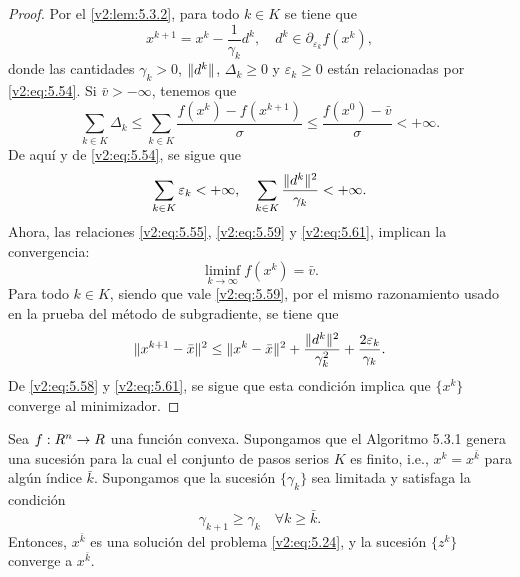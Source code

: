 \begin{proof}
    Por el \cref{v2:lem:5.3.2}, para todo $k \in K$ se tiene que
    \begin{equation}
        x^{k+1} = x^k - \frac{1}{\gamma_k} d^k, \quad d^k \in \partial_{\varepsilon_k} f(x^k),
        \label{v2:eq:5.59}
    \end{equation}
    donde las cantidades $\gamma_k > 0$, $\lVert d^k\rVert$, $\Delta_k \ge 0$ y $\varepsilon_k \ge 0$ están relacionadas por \eqref{v2:eq:5.54}.
    Si $\bar{v} > -\infty$, tenemos que
    \begin{equation}
        \sum_{k \in K} \Delta_k \le \sum_{k \in K} \frac{f(x^k) - f(x^{k+1})}{\sigma} \le \frac{f(x^0) - \bar{v}}{\sigma} < +\infty.
        \label{v2:eq:5.60}
    \end{equation}
    De aquí y de \eqref{v2:eq:5.54}, se sigue que
    \begin{equation}
        \sum_{k \in K} \varepsilon_k < +\infty, \quad \sum_{k \in K} \frac{\lVert d^k\rVert^2}{\gamma_k} < +\infty.
        \label{v2:eq:5.61}
    \end{equation}
    Ahora, las relaciones \eqref{v2:eq:5.55}, \eqref{v2:eq:5.59} y \eqref{v2:eq:5.61}, implican la convergencia:
    \[
        \liminf_{k \to \infty} f(x^k) = \bar{v}.
    \]
    Para todo $k \in K$, siendo que vale \eqref{v2:eq:5.59}, por el mismo razonamiento usado en la prueba del método de subgradiente, se tiene que
    \begin{equation}
        \lVert x^{k+1} - \bar{x}\rVert^2 \le \lVert x^k - \bar{x}\rVert^2 + \frac{\lVert d^k\rVert^2}{\gamma_k^2} + \frac{2\varepsilon_k}{\gamma_k}.
        \label{v2:eq:5.62}
    \end{equation}
    De \eqref{v2:eq:5.58} y \eqref{v2:eq:5.61}, se sigue que esta condición implica que $\{x^k\}$ converge al minimizador.
\end{proof}

\begin{theorem}\label{v2:thm:5.3.2}
    Sea $f : R^n \to R$ una función convexa. Supongamos que el Algoritmo 5.3.1 genera una sucesión para la cual el conjunto de pasos serios $K$ es finito, i.e., $x^k = x^{\bar{k}}$ para algún índice $\bar{k}$. Supongamos que la sucesión $\{\gamma_k\}$ sea limitada y satisfaga la condición
    \begin{equation}
        \gamma_{k+1} \ge \gamma_k \quad \forall k \ge \bar{k}.
        \label{v2:eq:5.63}
    \end{equation}
    Entonces, $x^{\bar{k}}$ es una solución del problema \eqref{v2:eq:5.24}, y la sucesión $\{z^k\}$ converge a $x^{\bar{k}}$.
\end{theorem}

